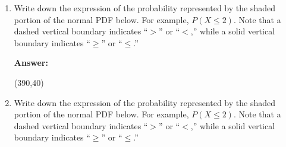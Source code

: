 \documentclass[11pt,twoside]{article}
\newcommand{\pts}[1]{\marginpar{ \small\hspace{0pt} \textit{[#1]} } }
\numberwithin{equation}{section}
\newcommand{\?}{\stackrel{?}{=}}
\begin{document}

   

  \begin{enumerate}[\bf (a)]

  \item   Write down the expression of the probability represented by the shaded portion of the normal PDF below. \pts{1} For example, $P(X \le
    2)$. Note that a dashed vertical boundary indicates ``$>$'' or ``$<$,'' while a solid vertical boundary indicates ``$\ge$'' or
    ``$\le$.''

          \begin{figure}[h!]
    \centering

\end{figure}

      \vspace{2ex}
  \begin{minipage}[]{.1\linewidth}
    {\bf Answer:}
  \end{minipage}\qquad
  \begin{minipage}[]{.8\linewidth}
    \framebox(390,40){\phantom{\Huge t}  }     
  \end{minipage}

  \bigskip
  
  \item   Write down the expression of the probability represented by the shaded portion of the normal PDF below. \pts{1} For example, $P(X \le
    2)$. Note that a dashed vertical boundary indicates ``$>$'' or ``$<$,'' while a solid vertical boundary indicates ``$\ge$'' or
    ``$\le$.''


\end{enumerate}
\end{document}
